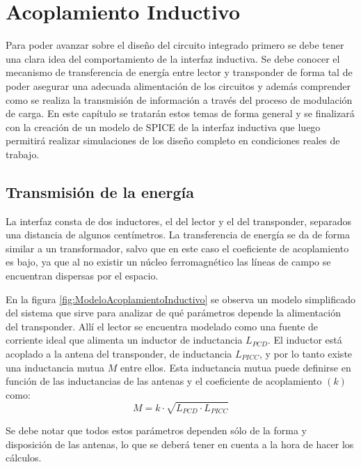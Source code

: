 
\chapter{Acoplamiento Inductivo}
\label{cap:AcoplamientoInductivo}

Para poder avanzar sobre el diseño del circuito integrado primero se debe 
tener una clara idea del comportamiento de la interfaz inductiva. Se debe 
conocer el mecanismo de transferencia de energía entre lector y transponder 
de forma tal de poder asegurar una adecuada alimentación de los circuitos y 
además comprender como se realiza la transmisión de información a través del 
proceso de modulación de carga. En este capítulo se tratarán estos 
temas de forma general y se finalizará con la creación de un modelo de 
SPICE de la interfaz inductiva que luego permitirá realizar simulaciones
de los diseño completo en condiciones reales de trabajo.


\section{Transmisión de la energía}
\label{sec:TransmisionDeLaEnergia}

La interfaz consta de dos inductores, el del lector y el del transponder, 
separados una distancia de algunos centímetros. La transferencia de energía 
se da de forma similar a un transformador, salvo que en este caso el 
coeficiente de acoplamiento es bajo, ya que al no existir un núcleo 
ferromagnético las líneas de campo se encuentran dispersas por el espacio.

En la figura \ref{fig:ModeloAcoplamientoInductivo} se observa un modelo 
simplificado del sistema que sirve para analizar de qué parámetros depende 
la alimentación del transponder. Allí el lector se encuentra modelado como 
una fuente de corriente ideal que alimenta un inductor de inductancia \(
L_{PCD}\). El inductor está acoplado a la antena del transponder, de 
inductancia \(L_{PICC}\), y por lo tanto existe una inductancia mutua \(M\) 
entre ellos. Esta inductancia mutua puede definirse en función de las 
inductancias de las antenas y el coeficiente de acoplamiento \((k)\) como: 
\[M=k \cdot \sqrt{L_{PCD} \cdot L_{PICC}}\]

Se debe notar que todos estos parámetros dependen sólo de la forma y 
disposición de las antenas, lo que se deberá tener en cuenta a la hora de 
hacer los cálculos.

